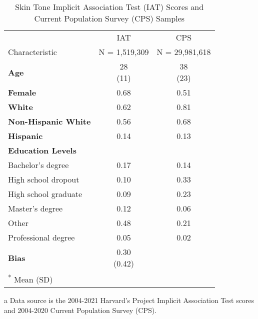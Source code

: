 \begin{table}[H]

\caption{Skin Tone Implicit Association Test (IAT) Scores and Current Population Survey (CPS) Samples \label{tab:sumstat-iat}}
\centering
\begin{threeparttable}
\begin{tabular}[t]{>{}lcc}
\toprule
\multicolumn{1}{c}{ } & \multicolumn{1}{c}{IAT} & \multicolumn{1}{c}{CPS} \\
\cmidrule(l{3pt}r{3pt}){2-2} \cmidrule(l{3pt}r{3pt}){3-3}
Characteristic & N = 1,519,309 & N = 29,981,618\\
\midrule
\textbf{Age} & \makecell[c]{28 \\ (11)} & \makecell[c]{38 \\ (23)}\\
\textbf{Female} & 0.68 & 0.51\\
\textbf{White} & 0.62 & 0.81\\
\textbf{Non-Hispanic White} & 0.56 & 0.68\\
\textbf{Hispanic} & 0.14 & 0.13\\
\textbf{Education Levels} &  & \\
\hspace{1em}Bachelor's degree & 0.17 & 0.14\\
\hspace{1em}High school dropout & 0.10 & 0.33\\
\hspace{1em}High school graduate & 0.09 & 0.23\\
\hspace{1em}Master's degree & 0.12 & 0.06\\
\hspace{1em}Other & 0.48 & 0.21\\
\hspace{1em}Professional degree & 0.05 & 0.02\\
\textbf{Bias} & \makecell[c]{0.30 \\ (0.42)} & \\
\bottomrule
\multicolumn{3}{l}{\rule{0pt}{1em}\textsuperscript{*} Mean (SD)}\\
\end{tabular}
\begin{tablenotes}
\item[a] Data source is the 2004-2021 Harvard's Project Implicit Association Test scores and 2004-2020 Current Population Survey (CPS).
\end{tablenotes}
\end{threeparttable}
\end{table}
